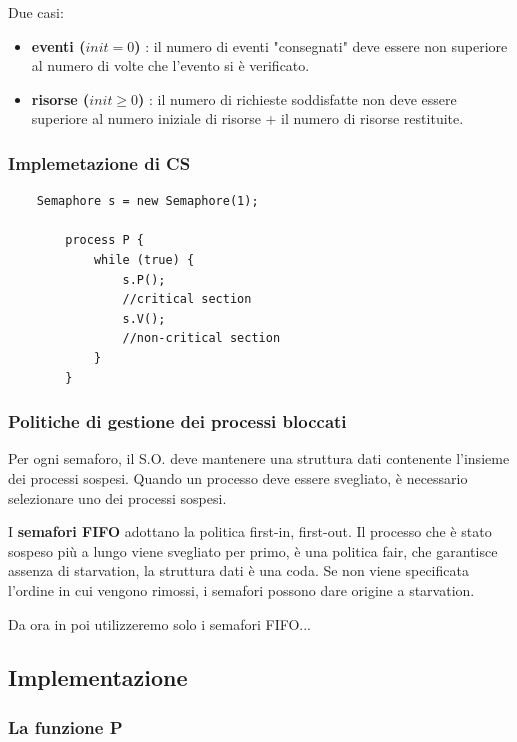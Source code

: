 Due casi:
\begin{itemize}
    \item \textbf{eventi ($init = 0$)} : il numero di eventi "consegnati" deve essere non superiore al numero di volte che l'evento si è verificato.
    \item \textbf{risorse ($init \geq 0$)} : il numero di richieste soddisfatte non deve essere superiore al numero iniziale di risorse + il numero di risorse restituite.
\end{itemize}

\subsubsection{Implemetazione di CS}
\begin{lstlisting}
    Semaphore s = new Semaphore(1);

        process P {
            while (true) {
                s.P();
                //critical section
                s.V();
                //non-critical section
            }
        }
\end{lstlisting}

\subsubsection{Politiche di gestione dei processi bloccati}
Per ogni semaforo, il S.O. deve mantenere una struttura dati contenente l'insieme dei processi sospesi. Quando un processo deve essere svegliato, è necessario selezionare uno dei processi sospesi.

I \textbf{semafori FIFO} adottano la politica first-in, first-out.
Il processo che è stato sospeso più a lungo viene svegliato per primo, è una politica fair, che garantisce assenza di starvation, la struttura dati è una coda.
Se non viene specificata l'ordine in cui vengono rimossi, i semafori possono dare origine a starvation.
\newline

Da ora in poi utilizzeremo solo i semafori FIFO...
\newpage

\subsection{Implementazione}

\subsubsection{La funzione P}

